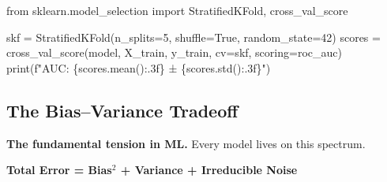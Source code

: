 \documentclass[11pt]{article}
\newenvironment{Shaded}{\begin{snugshade}}{\end{snugshade}}
\newcommand{\BuiltInTok}[1]{\textcolor[rgb]{0.50,0.55,0.55}{#1}}
\newcommand{\DecValTok}[1]{\textcolor[rgb]{0.96,0.45,0.00}{#1}}
\newcommand{\ImportTok}[1]{\textcolor[rgb]{0.15,0.68,0.38}{#1}}
\newcommand{\NormalTok}[1]{\textcolor[rgb]{0.81,0.81,0.76}{#1}}
\newcommand{\OperatorTok}[1]{\textcolor[rgb]{0.81,0.81,0.76}{#1}}
\newcommand{\SpecialCharTok}[1]{\textcolor[rgb]{0.24,0.68,0.91}{#1}}
\newcommand{\SpecialStringTok}[1]{\textcolor[rgb]{0.85,0.27,0.33}{#1}}
\newcommand{\StringTok}[1]{\textcolor[rgb]{0.96,0.31,0.31}{#1}}
\newcommand{\VariableTok}[1]{\textcolor[rgb]{0.15,0.68,0.68}{#1}}
\begin{document}
\begin{Shaded}
\begin{Highlighting}[]
\ImportTok{from}\NormalTok{ sklearn.model\_selection }\ImportTok{import}\NormalTok{ StratifiedKFold, cross\_val\_score}

\NormalTok{skf }\OperatorTok{=}\NormalTok{ StratifiedKFold(n\_splits}\OperatorTok{=}\DecValTok{5}\NormalTok{, shuffle}\OperatorTok{=}\VariableTok{True}\NormalTok{, random\_state}\OperatorTok{=}\DecValTok{42}\NormalTok{)}
\NormalTok{scores }\OperatorTok{=}\NormalTok{ cross\_val\_score(model, X\_train, y\_train, cv}\OperatorTok{=}\NormalTok{skf, scoring}\OperatorTok{=}\StringTok{\textquotesingle{}roc\_auc\textquotesingle{}}\NormalTok{)}
\BuiltInTok{print}\NormalTok{(}\SpecialStringTok{f"AUC: }\SpecialCharTok{\{}\NormalTok{scores}\SpecialCharTok{.}\NormalTok{mean()}\SpecialCharTok{:.3f\}}\SpecialStringTok{ ± }\SpecialCharTok{\{}\NormalTok{scores}\SpecialCharTok{.}\NormalTok{std()}\SpecialCharTok{:.3f\}}\SpecialStringTok{"}\NormalTok{)}
\end{Highlighting}
\end{Shaded}

\subsection{The Bias--Variance Tradeoff}\label{the-biasvariance-tradeoff}


\textbf{The fundamental tension in ML.} Every model lives on this spectrum.

\textbf{Total Error = Bias\(^2\) + Variance + Irreducible Noise}
\end{document}

